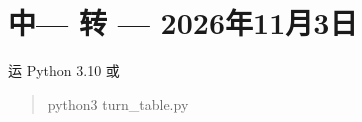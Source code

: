 \documentclass[11pt,a4paper]{article}
\begin{document}
\clearpage\section{{\cjkfont 中}\allowbreak{}— {\cjkfont 转}\allowbreak{} — 2026{\cjkfont 年}\allowbreak{}11{\cjkfont 月}\allowbreak{}3{\cjkfont 日}\allowbreak{}}

{\cjkfont 运}\allowbreak{} Python 3.10 {\cjkfont 或}\allowbreak{}

\begin{quote}\ttfamily\footnotesize python3 turn\_table.py\end{quote}
\end{document}
